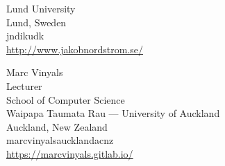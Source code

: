 \documentclass{toc}
\begin{document}
\begin{tocauthors}
\begin{tocinfo}[nordstrom]
  Lund University\\
  Lund, Sweden\\
  jn\tocat{}di\tocdot{}ku\tocdot{}dk \\   %
 \url{http://www.jakobnordstrom.se/}      %
\end{tocinfo}
\begin{tocinfo}[vinyals]
  Marc Vinyals\\
  Lecturer\\
  School of Computer Science\\
  Waipapa Taumata Rau --- University of Auckland\\
  Auckland, New Zealand\\
  marc\tocdot{}vinyals\tocat{}auckland\tocdot{}ac\tocdot{}nz \\   %
  \url{https://marcvinyals.gitlab.io/}      %
\end{tocinfo}
\end{tocauthors}
\end{document}
